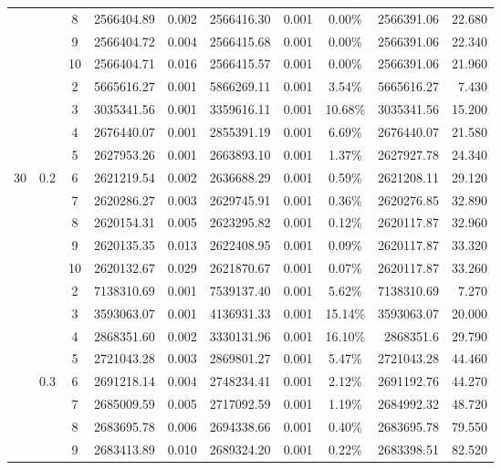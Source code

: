 {\begin{longtable}{cccrcrrcrr}
			&       & 8     & 2566404.89 & 0.002 & 2566416.30 & 0.001 & 0.00\% & 2566391.06 & 22.680 \\
			&       & 9     & 2566404.72 & 0.004 & 2566415.68 & 0.001 & 0.00\% & 2566391.06 & 22.340 \\
			&       & 10    & 2566404.71 & 0.016 & 2566415.57 & 0.001 & 0.00\% & 2566391.06 & 21.960 \\
			&       & 2     & 5665616.27 & 0.001 & 5866269.11 & 0.001 & 3.54\% & 5665616.27 & 7.430 \\
			&       & 3     & 3035341.56 & 0.001 & 3359616.11 & 0.001 & 10.68\% & 3035341.56 & 15.200 \\
			&       & 4     & 2676440.07 & 0.001 & 2855391.19 & 0.001 & 6.69\% & 2676440.07 & 21.580 \\
			&       & 5     & 2627953.26 & 0.001 & 2663893.10 & 0.001 & 1.37\% & 2627927.78 & 24.340 \\
	  30    & 0.2   & 6     & 2621219.54 & 0.002 & 2636688.29 & 0.001 & 0.59\% & 2621208.11 & 29.120 \\
			&       & 7     & 2620286.27 & 0.003 & 2629745.91 & 0.001 & 0.36\% & 2620276.85 & 32.890 \\
			&       & 8     & 2620154.31 & 0.005 & 2623295.82 & 0.001 & 0.12\% & 2620117.87 & 32.960 \\
			&       & 9     & 2620135.35 & 0.013 & 2622408.95 & 0.001 & 0.09\% & 2620117.87 & 33.320 \\
			&       & 10    & 2620132.67 & 0.029 & 2621870.67 & 0.001 & 0.07\% & 2620117.87 & 33.260 \\
			&       & 2     & 7138310.69 & 0.001 & 7539137.40 & 0.001 & 5.62\% & 7138310.69 & 7.270 \\
			&       & 3     & 3593063.07 & 0.001 & 4136931.33 & 0.001 & 15.14\% & 3593063.07 & 20.000 \\
			&       & 4     & 2868351.60 & 0.002 & 3330131.96 & 0.001 & 16.10\% & 2868351.6 & 29.790 \\
			&       & 5     & 2721043.28 & 0.003 & 2869801.27 & 0.001 & 5.47\% & 2721043.28 & 44.460 \\
			& 0.3   & 6     & 2691218.14 & 0.004 & 2748234.41 & 0.001 & 2.12\% & 2691192.76 & 44.270 \\
			&       & 7     & 2685009.59 & 0.005 & 2717092.59 & 0.001 & 1.19\% & 2684992.32 & 48.720 \\
			&       & 8     & 2683695.78 & 0.006 & 2694338.66 & 0.001 & 0.40\% & 2683695.78 & 79.550 \\
			&       & 9     & 2683413.89 & 0.010 & 2689324.20 & 0.001 & 0.22\% & 2683398.51 & 82.520 \\

\end{longtable}}

